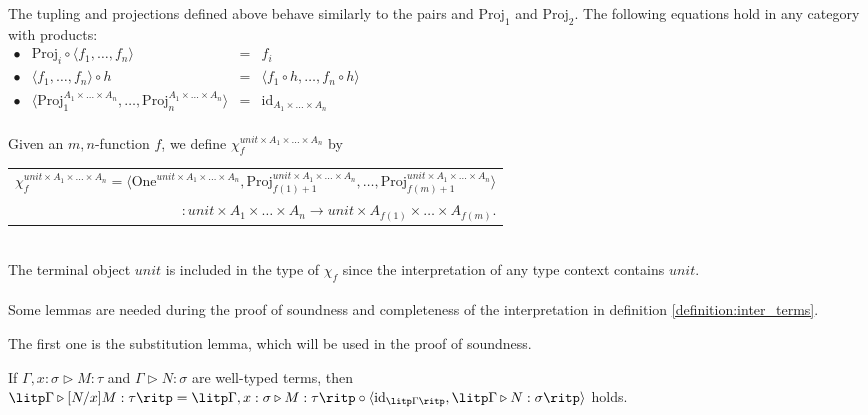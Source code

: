 The tupling and projections defined above behave similarly to the pairs and $ \text{Proj}_1 $ and $ \text{Proj}_2 $. The following equations hold in any category with products:\\[5pt]
$
\begin{array}{rlcl}
\bullet & \text{Proj}_i \circ \langle f_1, \ldots , f_n \rangle & = & f_i \\[5pt]
\bullet & \langle f_1, \ldots , f_n \rangle \circ h & = & \langle f_1 \circ h, \ldots , f_n \circ h \rangle \\[5pt]
\bullet & \langle \text{Proj}_1^{A_1 \times \ldots \times A_n}, \ldots , \text{Proj}_n^{A_1 \times \ldots \times A_n} \rangle & = & \text{id}_{A_1 \times \ldots \times A_n} \\[10pt]
\end{array}
$

Given an $m,n$-function $ f $, we define $ \chi_f^{unit \times A_1 \times \ldots \times A_n} $ by \\[3pt]
\begin{tabular}{m{}}
$
\chi_f^{unit \times A_1 \times \ldots \times A_n} = \langle \text{One}^{unit \times A_1 \times \ldots \times A_n}, \text{Proj}_{f(1)+1}^{unit \times A_1 \times \ldots \times A_n}, \ldots , \text{Proj}_{f(m)+1}^{unit \times A_1 \times \ldots \times A_n} \rangle
$ \\[3pt]
\multicolumn{1}{r}{$ : unit \times A_1 \times \ldots \times A_n \to unit \times A_{f(1)} \times \ldots \times A_{f(m)} $.}
\end{tabular} \\[3pt]
The terminal object $ unit $ is included in the type of $ \chi_f $ since the interpretation of any type context contains $ unit $.
\\
\\
Some lemmas are needed during the proof of soundness and completeness of the interpretation in definition \ref{definition:inter_terms}.

The first one is the substitution lemma, which will be used in the proof of soundness.

\begin{lemma}
\label{lemma:subs}
If $ \Gamma , x: \sigma \triangleright M: \tau $ and $ \Gamma \triangleright N: \sigma $ are well-typed terms, then $ \litp \Gamma \triangleright [N/x]M: \tau \ritp = \litp \Gamma , x: \sigma \triangleright M: \tau \ritp \circ \langle \textnormal{id}_{\litp \Gamma \ritp} , \litp \Gamma \triangleright N: \sigma \ritp \rangle $ holds.
\end{lemma}

